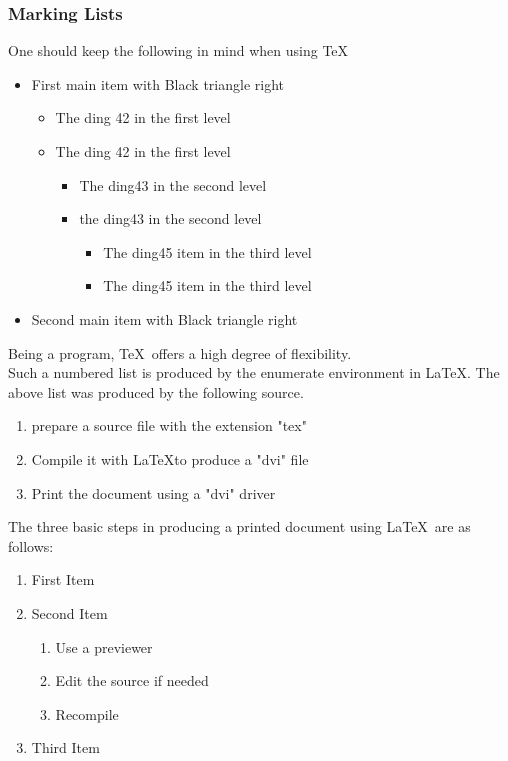 \documentclass{article}
\theoremstyle{definition}
\theoremstyle{remark}
\theoremstyle{plain}
\numberwithin{equation}{subsection}
\begin{document}
\subsubsection{Marking Lists}
One should keep the following in mind when using \TeX
{\renewcommand{\labelitemi}{$\blacktriangleright$}
	\begin{itemize}
	\item First main item with Black triangle right{
         \renewcommand{\labelitemii}{\ding{42}}
         \renewcommand{\labelitemiii}{\ding{43}}
         \renewcommand{\labelitemiv}{\ding{45}}
         	\begin{itemize}
         		\item The ding 42 in the first level         		
         		\item The ding 42 in the first level
         		\begin{itemize}
         			\item The ding43 in the second level
         			\item the ding43 in the second level
         			\begin{itemize}
         				\item The ding45 item in the third level
         				\item The ding45 item in the third level
         		    \end{itemize}
         	    \end{itemize}
             \end{itemize}}
	\item Second main item with Black triangle right
	\end{itemize}
Being a program, \TeX\ offers a high degree of flexibility.\\

\noindent Such a numbered list is produced by the enumerate environment in \LaTeX. The above list
was produced by the following source.
\begin{enumerate}
	\item prepare a source file with the extension "tex"
    \item Compile it with \LaTeX to produce a "dvi" file
    \item Print the document using a "dvi" driver
\end{enumerate}
The three basic steps in producing a printed document using \LaTeX\ are as follows:
\begin{enumerate}
	\item  First Item
	\item  Second Item
	\begin{enumerate}
		\item Use a previewer 
		\item Edit the source if needed
		\item Recompile
	\end{enumerate}
	\item Third Item
\end{enumerate}
}
\end{document}
